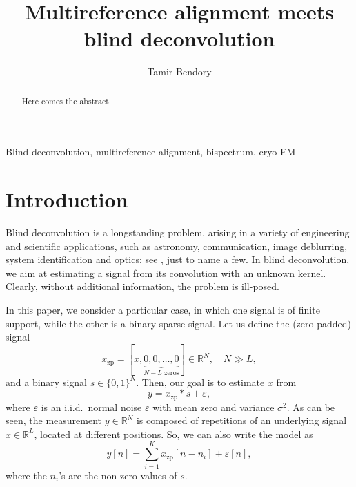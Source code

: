 \documentclass[journal]{IEEEtran}
\numberwithin{equation}{section}
\numberwithin{figure}{section}
\theoremstyle{plain}
\theoremstyle{definition}
\theoremstyle{remark}
\theoremstyle{plain}
\theoremstyle{remark}
\theoremstyle{plain}
\theoremstyle{plain}
\newcommand{\RL}{\mathbb{R}^L}
\newcommand{\RN}{\mathbb{R}^N}
\newcommand{\xz}{x_{\textrm{zp}}}
\begin{document}


\title{Multireference alignment meets blind deconvolution}
\author{Tamir Bendory}
\maketitle

\begin{abstract}
	Here comes the abstract
\end{abstract}

\begin{IEEEkeywords}
	Blind deconvolution, multireference alignment, bispectrum, cryo-EM
\end{IEEEkeywords}


\section{Introduction} \label{sec:introduction}

Blind deconvolution is a longstanding problem, arising in a variety of engineering and scientific applications, such as astronomy, communication, image deblurring, system identification and optics; see   \cite{jefferies1993restoration,tong1994blind,chan1998total,campisi2016blind,kundur1996blind,levin2011understanding,shalvi1990new,levin2009understanding,krishnan2011blind,ayers1988iterative,michaeli2014blind,lin2005relevant,abed1997blind}, just to name a few. In blind deconvolution, we aim at estimating  a signal from its convolution with an unknown kernel. 
Clearly, without additional information, the problem is ill-posed.

In this paper, we consider a particular case, in which one signal is of finite support, while the other is a binary sparse signal. Let us define the (zero-padded) signal 
$$\xz  = [x, \underbrace{0,0,\ldots,0}_{N-L \text{ zeros}}]\in\RN,\quad N\gg L,$$
and a binary signal $s\in\{0,1\}^N$. Then, our goal is to estimate $x$ from \begin{equation} \label{eq:blind_deconvolution}
y = \xz \ast s + \varepsilon,
\end{equation}
where $\varepsilon$ is an i.i.d.\ normal noise $\varepsilon$ with mean zero and variance $\sigma^2$.
As can be seen, the measurement $y\in\RN$ is composed of repetitions of an underlying signal $x\in\RL$, located at different positions. So, we can also write the model as  
\begin{equation}
y[n] = \sum_{i=1}^K \xz [n-n_i] + \varepsilon[n], 
\end{equation}
where the $n_i$'s are the non-zero values of $s$.
\end{document}
